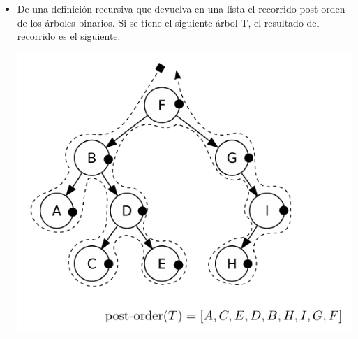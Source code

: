 \documentclass[letterpaper,11pt]{article}
\begin{document}
\begin{enumerate}
\begin{itemize}
\begin{proof}
\begin{itemize}
                Como el número de hojas de $T$ es el número de hojas de $T_{1}$
                más el número de hojas de $T_{2}$, entonces podemos definir 
                recursivamente una función $nh$ que calcule el número de hojas de  
                $T$. Así, 
                \begin{align*}
                    nh(T) 
                    &= nh(T_{1}) + nh(T_{2})
                    && \text{definición recursiva de $nh$} \\ 
                    &\leq 2^{n_{1}-1} + 2^{n_{2}-1}
                    && \text{por H.I.} \\
                    &\leq 2^{max\{n_{1}, n_{2}\}-1} + 2^{max\{n_{1}, n_{2}\}-1}
                    && \text{ya que $n_{i} = max\{n_{1}, n_{2}\}$} \\ 
                    &= 2 ⋅ 2^{max\{n_{1}, n_{2}\}-1}
                    && \text{aritmética} \\ 
                    &= 2^{max\{n_{1}, n_{2}\}-1+1}
                    && \text{leyes de exponentes} \\ 
                    &= 2^{max\{n_{1}, n_{2}\}}
                    && \text{simplificando}
                \end{align*}
            \end{itemize}
        \end{proof}
        \item De una definición recursiva que devuelva en una lista el recorrido
        post-orden de los árboles binarios. Si se tiene el siguiente árbol T, 
        el resultado del recorrido es el siguiente:
        \begin{center}
            \centerline{\includegraphics[scale=0.7]{recorrido.png}}
        \end{center} 
        

\end{itemize}
\end{enumerate}
\end{document}
